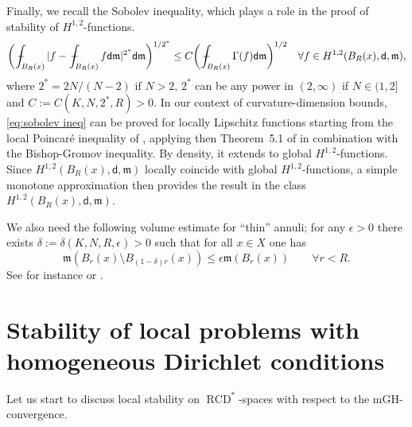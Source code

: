 \documentclass[a4paper,11pt,reqno]{article}
\numberwithin{equation}{section}
\theoremstyle{plain}
\theoremstyle{definition}
\theoremstyle{remark}
\newcommand{\dist}{\mathsf{d}}
\newcommand{\meas}{\mathfrak{m}}
\DeclareMathOperator{\RCD}{RCD}
\newcommand{\mean}[1]{\,-\hskip-1.08em\int_{#1}}
\begin{document}
{Finally, we recall the Sobolev inequality, which plays a role in the proof of stability of $H^{1,2}$-functions.
\begin{align}\label{eq:sobolev ineq}
\biggl(\mean{B_R(x)}|f-\mean{B_R(x)}f\dist\meas|^{2^*}\dist\meas\biggr)^{1/2^*}\leq C\biggl(\mean{B_R(x)}\Gamma(f)\dist\meas\biggr)^{1/2}
\quad\forall f \in H^{1, 2}(B_R(x), \dist, \meas),
\end{align}
where $2^*=2N/(N-2)$ if $N>2$, $2^*$ can be any power in $(2,\infty)$ if $N\in (1,2]$
and $C:=C(K, N, 2^*,R)>0$. In our context of curvature-dimension bounds, \eqref{eq:sobolev ineq} can be proved for
locally Lipschitz functions starting from the 
local Poincar\'e inequality of \cite{Rajala}, applying then Theorem~5.1 of \cite{HaKo} in combination with the
Bishop-Gromov inequality. By density, it extends to global $H^{1,2}$-functions. Since
$H^{1,2}(B_R(x),\dist,\meas)$ locally coincide with global $H^{1,2}$-functions, a simple
monotone approximation then provides the result in the class $H^{1,2}(B_R(x),\dist,\meas)$.


We also need the following volume estimate for ``thin'' annuli; for any $\epsilon >0$ there exists $\delta :=\delta (K, N, R, \epsilon)>0$ such that 
for all $x\in X$ one has
\begin{equation}\label{eq:annulus}
\meas (B_r(x) \setminus B_{(1-\delta)r}(x)) \le \epsilon \meas (B_r(x)) \qquad\forall r<R.
\end{equation}
See for instance \cite{ColdingMinicozzi} or \cite{Sturm06}.




\section{Stability of local problems with homogeneous Dirichlet conditions}\label{sec:2}

Let us start to discuss local stability on $\RCD^*$-spaces with respect to the mGH-convergence.

}
\end{document}
